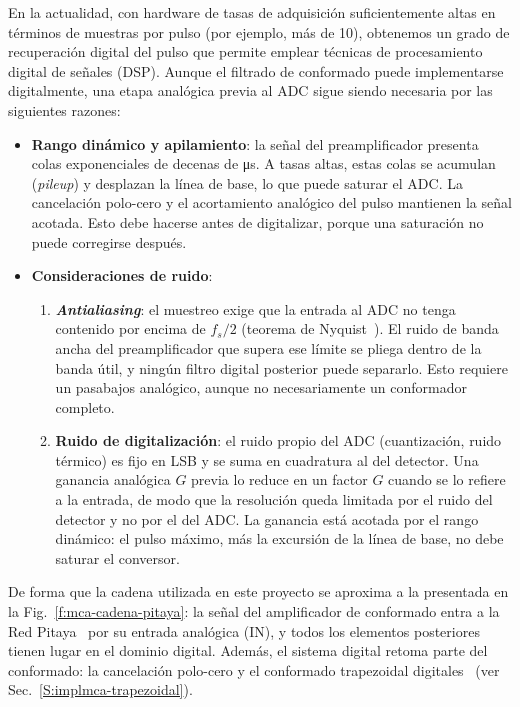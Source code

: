 En la actualidad, con hardware de tasas de adquisición suficientemente altas en
términos de muestras por pulso (por ejemplo, más de 10), obtenemos un grado de
recuperación digital del pulso que permite emplear técnicas de procesamiento
digital de señales (DSP). Aunque el filtrado de conformado puede implementarse
digitalmente, una etapa analógica previa al ADC sigue siendo necesaria por las
siguientes razones:
\begin{itemize}
  \item \textbf{Rango dinámico y apilamiento}: la señal del preamplificador
    presenta colas exponenciales de decenas de \unit{\micro\second}. A tasas
    altas, estas colas se acumulan (\emph{pileup}) y desplazan la línea de base,
    lo que puede saturar el ADC. La cancelación polo-cero y el acortamiento
    analógico del pulso mantienen la señal acotada. Esto debe hacerse antes de
    digitalizar, porque una saturación no puede corregirse después.
  \item \textbf{Consideraciones de ruido}:
  \begin{enumerate}
    \item \textbf{\emph{Antialiasing}}: el muestreo exige que la entrada al ADC no
      tenga contenido por encima de $f_s/2$ (teorema de
      Nyquist~). El ruido de banda ancha del
      preamplificador que supera ese límite se pliega dentro de la banda útil, y
      ningún filtro digital posterior puede separarlo. Esto requiere un
      pasabajos analógico, aunque no necesariamente un conformador completo.
    \item \textbf{Ruido de digitalización}: el ruido propio del ADC
      (cuantización, ruido térmico) es fijo en LSB y se suma en cuadratura al
      del detector. Una ganancia analógica $G$ previa lo reduce en un factor $G$
      cuando se lo refiere a la entrada, de modo que la resolución queda
      limitada por el ruido del detector y no por el del ADC. La ganancia está
      acotada por el rango dinámico: el pulso máximo, más la excursión de la
      línea de base, no debe saturar el conversor.
  \end{enumerate}
\end{itemize}

De forma que la cadena utilizada en este proyecto se aproxima a la presentada en
la Fig.~\ref{f:mca-cadena-pitaya}: la señal del amplificador de conformado entra
a la Red Pitaya~\cite{RedPitayaDocs} por su entrada analógica (IN), y todos los
elementos posteriores tienen lugar en el dominio digital. Además, el sistema
digital retoma parte del conformado: la cancelación polo-cero y el conformado
trapezoidal digitales~\cite{Jordanov1994} (ver
Sec.~\ref{S:implmca-trapezoidal}).

